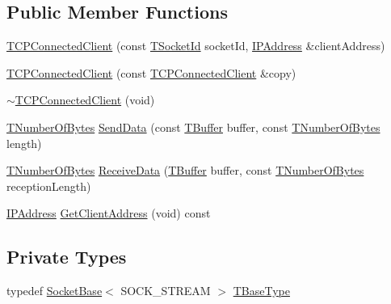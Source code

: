 \subsection*{Public Member Functions}
\begin{DoxyCompactItemize}
\item 
\hyperlink{class_t_c_p_connected_client_a6e1c47791a6603dfe5cacf425587f27b}{T\-C\-P\-Connected\-Client} (const \hyperlink{class_socket_base_aad53265037e46768af4d6a0c2ebed277}{T\-Socket\-Id} socket\-Id, \hyperlink{class_i_p_address}{I\-P\-Address} \&client\-Address)
\item 
\hyperlink{class_t_c_p_connected_client_a58e14efd1eccd877ec8dc4a3a0d6211d}{T\-C\-P\-Connected\-Client} (const \hyperlink{class_t_c_p_connected_client}{T\-C\-P\-Connected\-Client} \&copy)
\item 
\hyperlink{class_t_c_p_connected_client_aaf6bba3a6621001a030d36e117f9dd5e}{$\sim$\-T\-C\-P\-Connected\-Client} (void)
\item 
\hyperlink{class_socket_base_ac414903631491453b96e71c06c2c2e72}{T\-Number\-Of\-Bytes} \hyperlink{class_t_c_p_connected_client_a7c3a1d1172f3880b48d35ffbf255712d}{Send\-Data} (const \hyperlink{class_socket_base_a1557d64029a25c20b4c306b80efcc143}{T\-Buffer} buffer, const \hyperlink{class_socket_base_ac414903631491453b96e71c06c2c2e72}{T\-Number\-Of\-Bytes} length)
\item 
\hyperlink{class_socket_base_ac414903631491453b96e71c06c2c2e72}{T\-Number\-Of\-Bytes} \hyperlink{class_t_c_p_connected_client_a6bfa3ec7dc46c17dbccde8383c3253da}{Receive\-Data} (\hyperlink{class_socket_base_a1557d64029a25c20b4c306b80efcc143}{T\-Buffer} buffer, const \hyperlink{class_socket_base_ac414903631491453b96e71c06c2c2e72}{T\-Number\-Of\-Bytes} reception\-Length)
\item 
\hyperlink{class_i_p_address}{I\-P\-Address} \hyperlink{class_t_c_p_connected_client_a41e3600f6ae8c52a2a4a8eb1351bf200}{Get\-Client\-Address} (void) const 
\end{DoxyCompactItemize}
\subsection*{Private Types}
\begin{DoxyCompactItemize}
\item 
typedef \hyperlink{class_socket_base}{Socket\-Base}$<$ S\-O\-C\-K\-\_\-\-S\-T\-R\-E\-A\-M $>$ \hyperlink{class_t_c_p_connected_client_a8f789adb85d13f662bc739ac7979e270}{T\-Base\-Type}
\end{DoxyCompactItemize}
